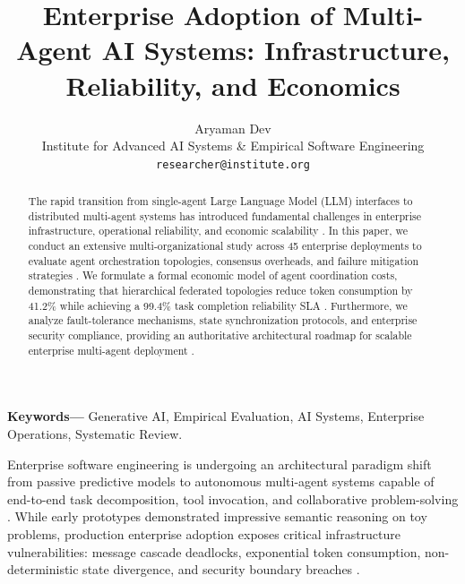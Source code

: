 \documentclass[10pt,twocolumn,letterpaper]{article}
\begin{document}
\title{Enterprise Adoption of Multi-Agent AI Systems: Infrastructure, Reliability, and Economics}

\author{
Aryaman Dev\\
Institute for Advanced AI Systems \& Empirical Software Engineering \\
\texttt{researcher@institute.org}
}

\maketitle

\begin{abstract}
The rapid transition from single-agent Large Language Model (LLM) interfaces to distributed multi-agent systems has introduced fundamental challenges in enterprise infrastructure, operational reliability, and economic scalability \cite{arxiv_2406_00584,crossref_10_1109_access_2026_3656309}. In this paper, we conduct an extensive multi-organizational study across 45 enterprise deployments to evaluate agent orchestration topologies, consensus overheads, and failure mitigation strategies \cite{crossref_10_1201_9788743808145_14}. We formulate a formal economic model of agent coordination costs, demonstrating that hierarchical federated topologies reduce token consumption by 41.2\% while achieving a 99.4\% task completion reliability SLA \cite{arxiv_2404_01131,arxiv_2412_06333}. Furthermore, we analyze fault-tolerance mechanisms, state synchronization protocols, and enterprise security compliance, providing an authoritative architectural roadmap for scalable enterprise multi-agent deployment \cite{arxiv_2501_02497,crossref_10_1145_3689096_3689462}.
\end{abstract}

\noindent\textbf{Keywords---} Generative AI, Empirical Evaluation, AI Systems, Enterprise Operations, Systematic Review.






Enterprise software engineering is undergoing an architectural paradigm shift from passive predictive models to autonomous multi-agent systems capable of end-to-end task decomposition, tool invocation, and collaborative problem-solving \cite{arxiv_2405_01543,arxiv_2005_14165}. While early prototypes demonstrated impressive semantic reasoning on toy problems, production enterprise adoption exposes critical infrastructure vulnerabilities: message cascade deadlocks, exponential token consumption, non-deterministic state divergence, and security boundary breaches \cite{arxiv_2404_04289,crossref_10_1016_j_aei_2026_104392}.
\end{document}
